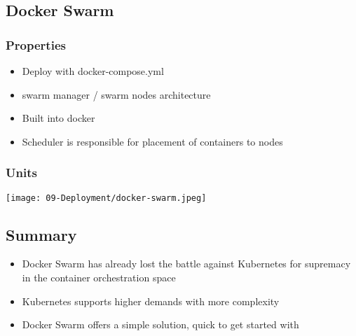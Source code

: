 
\subsection{Docker Swarm}
\subsubsection{Properties}
\begin{itemize}
    \item Deploy with docker-compose.yml
    \item swarm manager / swarm nodes architecture
    \item Built into docker
    \item Scheduler is responsible for placement of containers to nodes 
\end{itemize}

\subsubsection{Units}
\begin{center}
    \texttt{[image: 09-Deployment/docker-swarm.jpeg]}
\end{center}
\vspace{-8pt}

\subsection{Summary}
\begin{itemize}
    \item Docker Swarm has already lost the battle against Kubernetes for supremacy in the container orchestration space
    \item Kubernetes supports higher demands with more complexity
    \item Docker Swarm offers a simple solution, quick to get started with
\end{itemize}